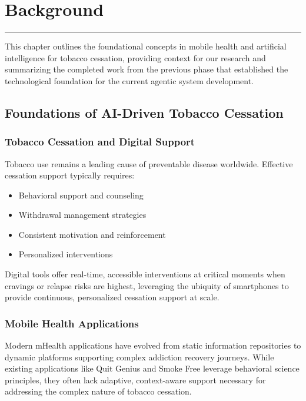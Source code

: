 \chapter{Background}
\label{Chapter2}

\begin{center}
\rule{0.5\textwidth}{0.5pt}
\end{center}

This chapter outlines the foundational concepts in mobile health and artificial intelligence for tobacco cessation, providing context for our research and summarizing the completed work from the previous phase that established the technological foundation for the current agentic system development.

\section{Foundations of AI-Driven Tobacco Cessation}

\subsection{Tobacco Cessation and Digital Support}

Tobacco use remains a leading cause of preventable disease worldwide. Effective cessation support typically requires:

\begin{itemize}
    \item Behavioral support and counseling
    \item Withdrawal management strategies
    \item Consistent motivation and reinforcement
    \item Personalized interventions
\end{itemize}

Digital tools offer real-time, accessible interventions at critical moments when cravings or relapse risks are highest, leveraging the ubiquity of smartphones to provide continuous, personalized cessation support at scale.

\subsection{Mobile Health Applications}

Modern mHealth applications have evolved from static information repositories to dynamic platforms supporting complex addiction recovery journeys. While existing applications like Quit Genius and Smoke Free leverage behavioral science principles, they often lack adaptive, context-aware support necessary for addressing the complex nature of tobacco cessation.

